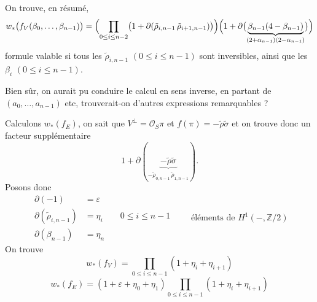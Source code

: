 \documentclass[11pt,a4paper]{article}
\begin{document}
On trouve, en résumé,
\[
w_*\bigl(f_V(\beta_0, \dots, \beta_{n-1})\bigr) = \Bigl(\prod_{0 \leq i \leq n-2} \bigl(1 + \partial(\tilde\rho_{i,n-1}\, \tilde\rho_{i+1,n-1})\bigr)\Bigr) \Bigl(1 + \partial\bigl(\underbrace{\beta_{n-1}(4 - \beta_{n-1})}_{(2 + \alpha_{n-1})(2 - \alpha_{n-1})}\bigr)\Bigr)
\]
formule valable si tous les $\tilde\rho_{i,n-1}$ $(0 \leq i \leq n-1)$ sont inversibles, ainsi que les $\beta_i$ $(0 \leq i \leq n-1)$.

Bien sûr, on aurait pu conduire le calcul en sens inverse, en \ill{} \ill{} partant de $(a_0, \dots, a_{n-1})$ etc,  trouverait-on d'autres expressions remarquables ?

Calculons $w_*(f_E)$,  on sait que $V^{\perp} = \mathcal{O}_S \pi$ et $f(\pi) = -\tilde\rho\tilde\sigma$ et on trouve donc un facteur supplémentaire
\[
1 + \partial(\underbrace{-\tilde\rho\tilde\sigma}_{-\tilde\rho_{0,n-1}\, \tilde\rho_{1,n-1}}) .
\]
Posons donc
\[
\begin{aligned}
\partial(-1) &= \varepsilon \\
\partial(\tilde\rho_{i,n-1}) &= \eta_i \qquad 0 \leq i \leq n-1 \\
\partial(\beta_{n-1}) &= \eta_n
\end{aligned}
\qquad \text{éléments de } H^1(-, \mathbb{Z}/2)
\]
On trouve
\[
w_*(f_V) = \prod_{0 \leq i \leq n-1} (1 + \eta_i + \eta_{i+1})
\]
\[
w_*(f_E) = (1 + \varepsilon + \eta_0 + \eta_1) \prod_{0 \leq i \leq n-1} (1 + \eta_i + \eta_{i+1})
\]
\end{document}
